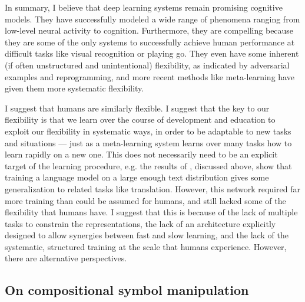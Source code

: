 In summary, I believe that deep learning systems remain promising cognitive models. They have successfully modeled a wide range of phenomena ranging from low-level neural activity to cognition. Furthermore, they are compelling because they are some of the only systems to successfully achieve human performance at difficult tasks like visual recognition or playing go. They even have some inherent (if often unstructured and unintentional) flexibility, as indicated by adversarial examples and reprogramming, and more recent methods like meta-learning have given them more systematic flexibility. \par
I suggest that humans are similarly flexible. I suggest that the key to our flexibility is that we learn over the course of development and education to exploit our flexibility in systematic ways, in order to be adaptable to new tasks and situations --- just as a meta-learning system learns over many tasks how to learn rapidly on a new one. This does not necessarily need to be an explicit target of the learning procedure, e.g. the results of \citet{Radford2019}, discussed above, show that training a language model on a large enough text distribution gives some generalization to related tasks like translation. However, this network required far more training than could be assumed for humans, and still lacked some of the flexibility that humans have. I suggest that this is because of the lack of multiple tasks to constrain the representations, the lack of an architecture explicitly designed to allow synergies between fast and slow learning, and the lack of the systematic, structured training at the scale that humans experience. However, there are alternative perspectives. \par 

\subsection{On compositional symbol manipulation} \label{sec:introduction:on_compositional}

